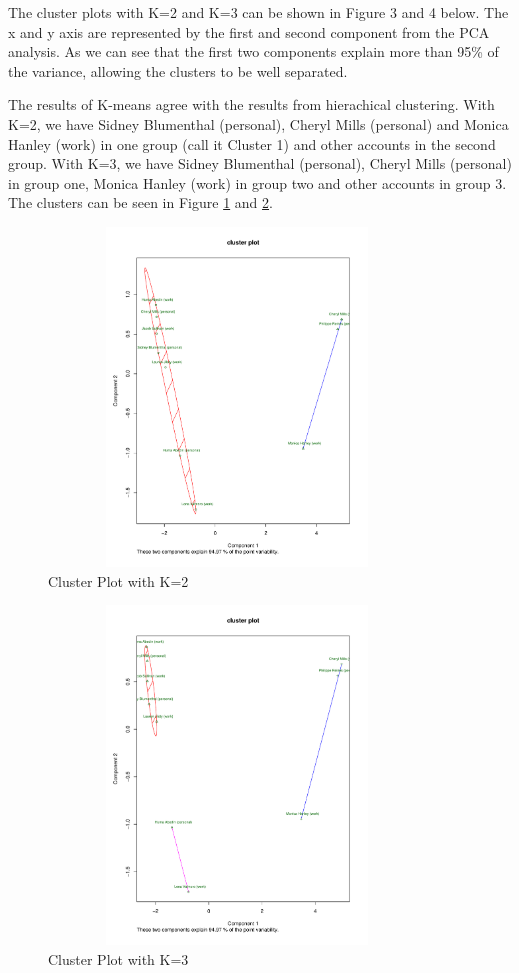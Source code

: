 The cluster plots with K=2 and K=3 can be shown in Figure 3 and 4 below. The x and y axis are represented by the first and second component from the PCA analysis. As we can see that the first two components explain more than 95\% of the variance, allowing the clusters to be well separated. 

The results of K-means agree with the results from hierachical clustering. With K=2, we have Sidney Blumenthal (personal), Cheryl Mills (personal) and Monica Hanley (work) in one group (call it Cluster 1) and other accounts in the second group. With K=3, we have Sidney Blumenthal (personal), Cheryl Mills (personal) in group one, Monica Hanley (work) in group two and other accounts in group 3. The clusters can be seen in Figure \ref{fig:c2} and \ref{fig:c3}.

\begin{figure}[h!]
    \centering
    \includegraphics[width=10cm,height=9cm]
    {daitong_and_yihe/c2}
    \caption{Cluster Plot with K=2}
    \label{fig:c2}
\end{figure}

\begin{figure}[h!]
    \centering
    \includegraphics[width=10cm,height=9cm]
    {daitong_and_yihe/c3}
    \caption{Cluster Plot with K=3}
    \label{fig:c3}
\end{figure}


